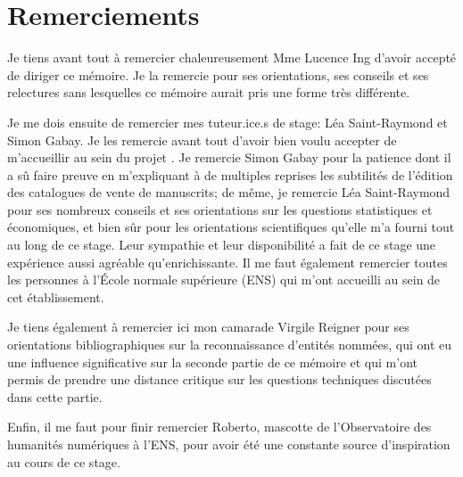 \chapter*{Remerciements}
Je tiens avant tout à remercier chaleureusement Mme Lucence Ing d'avoir accepté de diriger ce mémoire. Je la remercie pour ses orientations, ses conseils et ses relectures sans lesquelles ce mémoire aurait pris une forme très différente.

Je me dois ensuite de remercier mes tuteur.ice.s de stage: Léa Saint-Raymond et Simon Gabay. Je les remercie avant tout d'avoir bien voulu accepter de m'accueillir au sein du projet \mssktb{}. Je remercie Simon Gabay pour la patience dont il a sû faire preuve en m'expliquant à de multiples reprises les subtilités de l'édition \xmltei{} des catalogues de vente de manuscrits; de même, je remercie Léa Saint-Raymond pour ses nombreux conseils et ses orientations sur les questions statistiques et économiques, et bien sûr pour les orientations scientifiques qu'elle m'a fourni tout au long de ce stage. Leur sympathie et leur disponibilité a fait de ce stage une expérience aussi agréable qu'enrichissante. Il me faut également remercier toutes les personnes à l'École normale supérieure (ENS) qui m'ont accueilli au sein de cet établissement.

Je tiens également à remercier ici mon camarade Virgile Reigner pour ses orientations bibliographiques sur la reconnaissance d'entités nommées, qui ont eu une influence significative sur la seconde partie de ce mémoire et qui m'ont permis de prendre une distance critique sur les questions techniques discutées dans cette partie.

Enfin, il me faut pour finir remercier Roberto, mascotte de l'Observatoire des humanités numériques à l'ENS, pour avoir été une constante source d'inspiration au cours de ce stage.

\mainmatter
